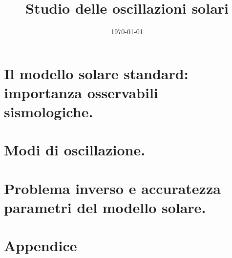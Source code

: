 \documentclass[oneside,11pt,fleqn]{memoir}
\author{ }
\title{Studio delle oscillazioni solari}
\date{\today}
\begin{document}
\frontmatter
{}
\maketitle

\tableofcontents

\clearpage

\thispagestyle{empty}



\clearpage

\mainmatter
{}

\part{Il modello solare standard: importanza osservabili sismologiche.}




\part{Modi di oscillazione.}



\part{Problema inverso e accuratezza parametri del modello solare.}



\backmatter


\part{Appendice}



\printbibliography
\end{document}
